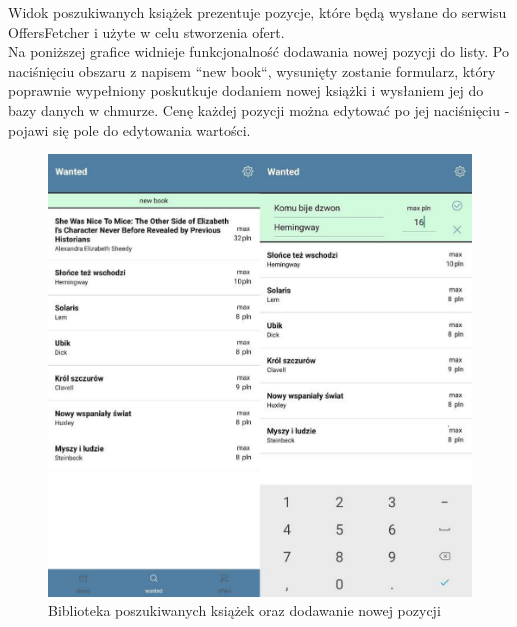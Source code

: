 \newpage
Widok poszukiwanych książek prezentuje pozycje, które będą wysłane do serwisu OffersFetcher i użyte w celu stworzenia ofert.\\
Na poniższej grafice widnieje funkcjonalność dodawania nowej pozycji do listy. Po naciśnięciu  obszaru z napisem ``new book``, wysunięty zostanie formularz, który poprawnie wypełniony poskutkuje dodaniem nowej książki i wysłaniem jej do bazy danych w chmurze. Cenę każdej pozycji można edytować po jej naciśnięciu - pojawi się pole do edytowania wartości.
\begin{figure}[H]
	\centering
	\includegraphics[width=\linewidth]{wanted.pdf}
	\caption{Biblioteka poszukiwanych książek oraz dodawanie nowej pozycji}
\end{figure}
\newpage

